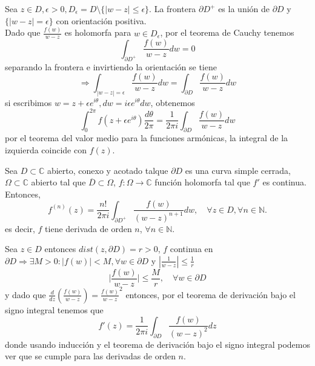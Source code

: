 \begin{dem}
  Sea $z \in D, \epsilon >0, D_{\epsilon} = D \setminus \{ | w - z | \leq \epsilon \}$. La frontera $\partial D^+$ es la unión de $\partial D$ y $\{ | w - z | = \epsilon \}$ con orientación positiva. \\

  Dado que $ \frac{f(w)}{w-z}$ es holomorfa para $w \in D_{\epsilon}$, por el teorema de Cauchy tenemos
  \[ 
    \int_{\partial D^+}^{} \frac{f(w)}{w - z} dw = 0 
  \] 
  separando la frontera e invirtiendo la orientación se tiene
  \[ 
    \Rightarrow \int_{|  w - z | = \epsilon}^{}  \frac{f(w)}{w-z} dw = \int_{\partial D}^{} \frac{f(w)}{w - z} dw 
  \] 
  si escribimos $w = z + \epsilon e^{i \theta}, dw = i \epsilon e^{i \theta} dw$, obtenemos
  \[ 
    \int_{0}^{2 \pi} f(z + \epsilon e^{i \theta}) \frac{d \theta}{2 \pi} =  \frac{1}{2 \pi i} \int_{\partial D}^{} \frac{f(w)}{w - z} dw
  \] 
  por el teorema del valor medio para la funciones armónicas, la integral de la izquierda coincide con $f(z)$.
\end{dem}

\begin{theo}
  Sea $D \subset \mathbb{C}$ abierto, conexo y acotado talque $\partial D$ es una curva simple cerrada, $\Omega \subset \mathbb{C}$ abierto tal que $\overline{D} \subset \Omega$, $f: \Omega \to \mathbb{C}$ función holomorfa tal que $ f'$ es continua. Entonces,
  \[ 
    f^{(n)}(z) = \frac{n!}{2 \pi i} \int_{\partial D^+}^{} \frac{f(w)}{(w - z)^{n+1}} dw, \quad \forall z \in D, \forall n \in \mathbb{N}.
  \] 
  es decir, $f$ tiene derivada de orden $n$, $\forall n \in \mathbb{N}$.
\end{theo}

\begin{dem}
  Sea $z \in D$ entonces $dist (z, \partial D) = r > 0$, $f$ continua en $\partial D \Rightarrow \exists M>0 : | f(w) | < M, \forall w \in \partial D$ y $| \frac{1}{w - z} | \leq \frac{1}{r} $
  \[ 
    \Big | \frac{f(w)}{w-z}  \Big |  \leq \frac{M}{r}, \quad \forall w \in \partial D
  \] 
  y dado que $\frac{d{}}{d{z}}(\frac{f(w)}{w -z}) = \frac{f(w)}{w-z}^2$ entonces, por el teorema de derivación bajo el signo integral tenemos que
  \[ 
    f'(z) = \frac{1}{2 \pi i} \int_{\partial D}^{} \frac{f(w)}{(w-z)^2} dz
  \] 
  donde usando inducción y el teorema de derivación bajo el signo integral podemos ver que se cumple para las derivadas de orden $n$.
\end{dem}

